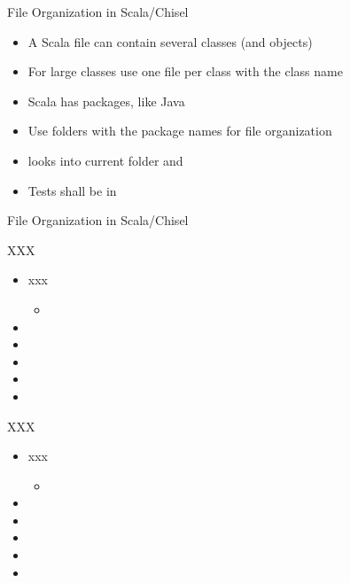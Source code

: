 \begin{frame}[fragile]{File Organization in Scala/Chisel}
\begin{itemize}
\item A Scala file can contain several classes (and objects)
\item For large classes use one file per class with the class name
\item Scala has packages, like Java
\item Use folders with the package names for file organization
\item {} looks into current folder and 
\item Tests shall be in 
\end{itemize}
\end{frame}

\begin{frame}[fragile]{File Organization in Scala/Chisel}
\end{frame}

\begin{frame}[fragile]{XXX}
\begin{itemize}
\item xxx
\begin{itemize}
\item
\end{itemize}
\item
\item
\item
\item
\item
\end{itemize}
\end{frame}


\begin{frame}[fragile]{XXX}
\begin{itemize}
\item xxx
\begin{itemize}
\item
\end{itemize}
\item
\item
\item
\item
\item
\end{itemize}
\end{frame}

